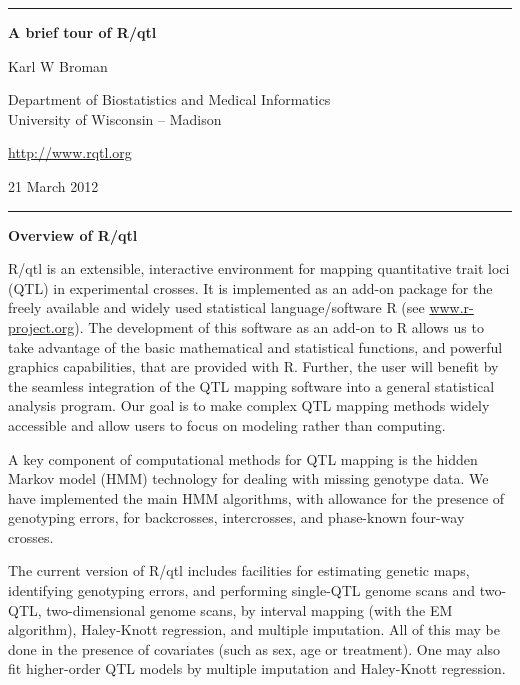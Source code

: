 \documentclass[10pt,letterpaper]{article}
\begin{document}
\begin{center}
\rule{7.0in}{1mm} \vspace{0mm}

{\Large \textbf{A brief tour of R/qtl}} \vspace{4mm}

{\large Karl W Broman} \vspace{2mm}

Department of Biostatistics and Medical Informatics\\
University of Wisconsin -- Madison

\vspace{2mm}
\href{http://www.rqtl.org}{http://www.rqtl.org}
\vspace{2mm}

21 March 2012 %

\rule{7.0in}{1mm} 
\end{center}

\noindent \textbf{Overview of R/qtl} \vspace{6pt}

R/qtl is an extensible, interactive environment for mapping
quantitative trait loci (QTL) in experimental crosses. It is
implemented as an add-on package for the freely available and widely
used statistical language/software R (see
\href{http://www.r-project.org}{www.r-project.org}). The development
of this software as an add-on to R allows us to take advantage of the
basic mathematical and statistical functions, and powerful graphics
capabilities, that are provided with R. Further, the user will benefit
by the seamless integration of the QTL mapping software into a general
statistical analysis program.  Our goal is to make complex QTL mapping
methods widely accessible and allow users to focus on modeling rather
than computing.

A key component of computational methods for QTL mapping is the hidden
Markov model (HMM) technology for dealing with missing genotype
data. We have implemented the main HMM algorithms, with allowance for
the presence of genotyping errors, for backcrosses, intercrosses, and
phase-known four-way crosses.

The current version of R/qtl includes facilities for estimating
genetic maps, identifying genotyping errors, and performing single-QTL
genome scans and two-QTL, two-dimensional genome scans, by interval
mapping (with the EM algorithm), Haley-Knott regression, and multiple
imputation. All of this may be done in the presence of covariates
(such as sex, age or treatment). One may also fit higher-order QTL models
by multiple imputation and Haley-Knott regression.
\end{document}
